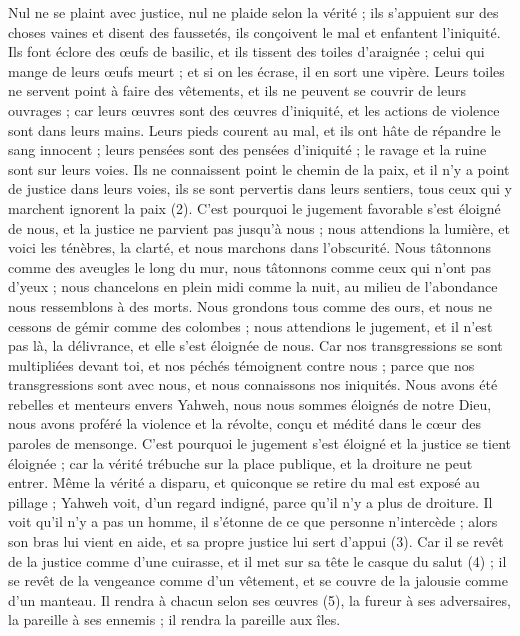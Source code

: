 \begin{multicols}{2}
Nul ne se plaint avec justice, nul ne plaide selon la vérité ; ils s’appuient sur des choses vaines et disent des faussetés, ils conçoivent le mal et enfantent l’iniquité.
Ils font éclore des œufs de basilic, et ils tissent des toiles d'araignée ; celui qui mange de leurs œufs meurt ; et si on les écrase, il en sort une vipère.
Leurs toiles ne servent point à faire des vêtements, et ils ne peuvent se couvrir de leurs ouvrages ; car leurs œuvres sont des œuvres d’iniquité, et les actions de violence sont dans leurs mains.
Leurs pieds courent au mal, et ils ont hâte de répandre le sang innocent ; leurs pensées sont des pensées d’iniquité ; le ravage et la ruine sont sur leurs voies.
Ils ne connaissent point le chemin de la paix, et il n'y a point de justice dans leurs voies, ils se sont pervertis dans leurs sentiers, tous ceux qui y marchent ignorent la paix (2).
C'est pourquoi le jugement favorable s'est éloigné de nous, et la justice ne parvient pas jusqu’à nous ; nous attendions la lumière, et voici les ténèbres, la clarté, et nous marchons dans l'obscurité.
Nous tâtonnons comme des aveugles le long du mur, nous tâtonnons comme ceux qui n’ont pas d’yeux ; nous chancelons en plein midi comme la nuit, au milieu de l’abondance nous ressemblons à des morts.
Nous grondons tous comme des ours, et nous ne cessons de gémir comme des colombes ; nous attendions le jugement, et il n’est pas là, la délivrance, et elle s'est éloignée de nous.
Car nos transgressions se sont multipliées devant toi, et nos péchés témoignent contre nous ; parce que nos transgressions sont avec nous, et nous connaissons nos iniquités.
Nous avons été rebelles et menteurs envers Yahweh, nous nous sommes éloignés de notre Dieu, nous avons proféré la violence et la révolte, conçu et médité dans le cœur des paroles de mensonge.
C'est pourquoi le jugement s'est éloigné et la justice se tient éloignée ; car la vérité trébuche sur la place publique, et la droiture ne peut entrer.
Même la vérité a disparu, et quiconque se retire du mal est exposé au pillage ; Yahweh voit, d’un regard indigné, parce qu'il n'y a plus de droiture.
Il voit qu’il n’y a pas un homme, il s’étonne de ce que personne n’intercède ; alors son bras lui vient en aide, et sa propre justice lui sert d’appui (3).
Car il se revêt de la justice comme d'une cuirasse, et il met sur sa tête le casque du salut (4) ; il se revêt de la vengeance comme d’un vêtement, et se couvre de la jalousie comme d'un manteau.
Il rendra à chacun selon ses œuvres (5), la fureur à ses adversaires, la pareille à ses ennemis ; il rendra la pareille aux îles.

\end{multicols}
